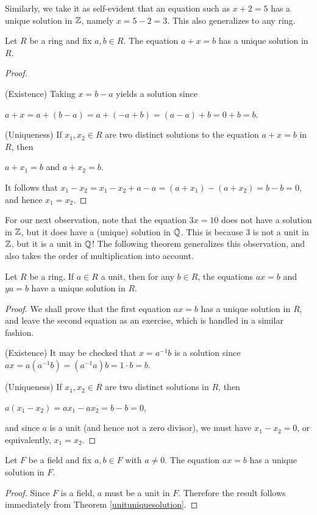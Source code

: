 \documentclass[11pt,fleqn,dvipsnames,usenames]{article}
\newcommand{\p}{\noindent}
\begin{document}
\p Similarly, we take it as self-evident that an equation such as $x + 2 = 5$ has a unique solution in $\mathbb{Z}$, namely $x = 5-2 = 3$.  This also generalizes to any ring.
%
\begin{theorem}
Let $R$ be a ring and fix $a,b\in R$.  The equation $a + x = b$ has a unique solution in $R$.
\end{theorem}
%
\begin{proof}~

\p (Existence) Taking $x = b - a$ yields a solution since
\begin{center}
$a + x = a + (b-a) = a + (-a + b) = (a - a) + b = 0 + b = b$.
\end{center}
\p (Uniqueness) If $x_{1},x_{2}\in R$ are two distinct solutions to the equation $a + x = b$ in $R$, then
\begin{center}
$a + x_{1} = b$ and $a + x_{2} = b$.
\end{center}
It follows that $x_{1} - x_{2} = x_{1} - x_{2} + a - a = (a+x_{1}) - (a+x_{2}) = b - b = 0$, and hence $x_{1} = x_{2}$.
\end{proof}
%
\p For our next observation, note that the equation $3x = 10$ does not have a solution in $\mathbb{Z}$, but it does have a (unique) solution in $\mathbb{Q}$.  This is because $3$ is not a unit in $\mathbb{Z}$, but it is a unit in $\mathbb{Q}$!  The following theorem generalizes this observation, and also takes the order of multiplication into account.
%
\begin{theorem}\label{unituniquesolution}
Let $R$ be a ring.  If $a\in R$ a unit, then for any $b\in R$, the equations $ax = b$ and $ya = b$ have a unique solution in $R$.
\end{theorem}
%
\begin{proof} We shall prove that the first equation $ax = b$ has a unique solution in $R$, and leave the second equation as an exercise, which is handled in a similar fashion.
\vsp

\p (Existence) It may be checked that $x = a^{-1}b$ is a solution since $ax = a(a^{-1}b) = (a^{-1}a)b = 1\cdot b = b$.
\vsp

\p (Uniqueness) If $x_{1},x_{2}\in R$ are two distinct solutions in $R$, then
\begin{center}
$a(x_{1} - x_{2}) = ax_{1} - ax_{2} = b - b = 0$,
\end{center}
and since $a$ is a unit (and hence not a zero divisor), we must have $x_{1} - x_{2} = 0$, or equivalently, $x_{1} = x_{2}$.
\end{proof}
%
\begin{corollary}\label{uniquelinearsolutioninfield}
Let $F$ be a field and fix $a,b\in F$ with $a\neq 0$.  The equation $ax = b$ has a unique solution in $F$.
\end{corollary}
\begin{proof}
Since $F$ is a field, $a$ must be a unit in $F$.  Therefore the result follows immediately from Theorem \ref{unituniquesolution}.
\end{proof}
\end{document}
